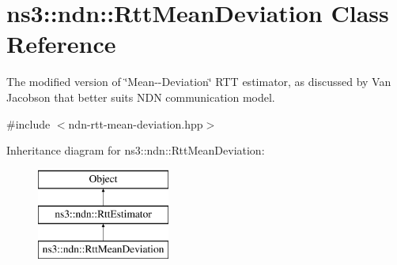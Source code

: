 \hypertarget{classns3_1_1ndn_1_1RttMeanDeviation}{}\section{ns3\+:\+:ndn\+:\+:Rtt\+Mean\+Deviation Class Reference}
\label{classns3_1_1ndn_1_1RttMeanDeviation}


The modified version of \char`\"{}\+Mean-\/-\/\+Deviation\char`\"{} R\+TT estimator, as discussed by Van Jacobson that better suits N\+DN communication model.  




{\ttfamily \#include $<$ndn-\/rtt-\/mean-\/deviation.\+hpp$>$}

Inheritance diagram for ns3\+:\+:ndn\+:\+:Rtt\+Mean\+Deviation\+:\begin{figure}[H]
\begin{center}
\leavevmode
\includegraphics[height=3.000000cm]{classns3_1_1ndn_1_1RttMeanDeviation}
\end{center}
\end{figure}
